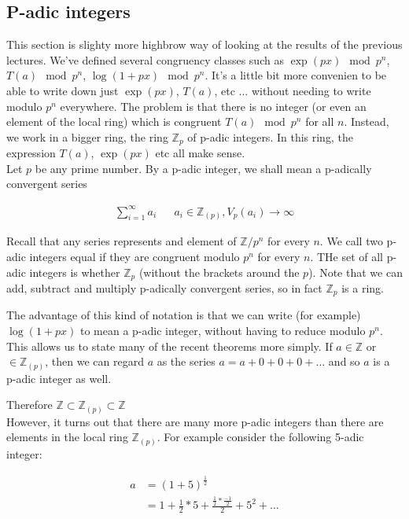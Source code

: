 \documentclass[11pt]{article}
\begin{document}
\subsection{P-adic integers}
This section is slighty more highbrow way of looking at the results of the previous lectures. We've defined several congruency classes such as $\exp(px) \mod p^n$, $T(a) \mod p^n$, $\log(1+px) \mod p^n$. It's a little bit more convenien to be able to write down just $\exp(px)$, $T(a)$, etc $\dots$ without needing to write modulo $p^n$ everywhere. The problem is that there is no integer (or even an element of the local ring) which is congruent $T(a) \mod p^n$ for all $n$. Instead, we work in a bigger ring, the ring $\mathbb{Z}_p$ of p-adic integers. In this ring, the expression $T(a)$, $\exp(px)$ etc all make sense.\\[1em]

Let $p$ be any prime number. By a p-adic integer, we shall mean a p-adically convergent series

\begin{align*}
	\sum^{\infty}_{i=1} a_i &&a_i \in \mathbb{Z}_{(p)}, V_p(a_i) \longrightarrow \infty
\end{align*}

Recall that any series represents and element of $\mathbb{Z}/p^n$ for every $n$. We call two p-adic integers equal if they are congruent modulo $p^n$ for every $n$. THe set of all p-adic integers is whether $\mathbb{Z}_p$ (without the brackets around the $p$). Note that we can add, subtract and multiply p-adically convergent series, so in fact $\mathbb{Z}_p$ is a ring. 

The advantage of this kind of notation is that we can write (for example) $\log(1+px)$ to mean a p-adic integer, without having to reduce modulo $p^n$. This allows us to state many of the recent theorems more simply. If $a \in \mathbb{Z}$ or $\in \mathbb{Z}_{(p)}$, then we can regard $a$ as the series $a = a + 0 + 0 + 0 +\dots$ and so $a$ is a p-adic integer as well.

Therefore $\mathbb{Z} \subset \mathbb{Z}_{(p)} \subset \mathbb{Z}$\\[1em]


However, it turns out that there are many more p-adic integers than there are elements in the local ring $\mathbb{Z}_{(p)}$. For example consider the following 5-adic integer:

\begin{align*}
	a &= (1+5) ^\frac{1}{2}\\
	 &= 1+ \frac{1}{2}*5 + \frac{\frac{1}{2}*\frac{-1}{2}}{2} + 5^2 + \dots
\end{align*}
\end{document}
